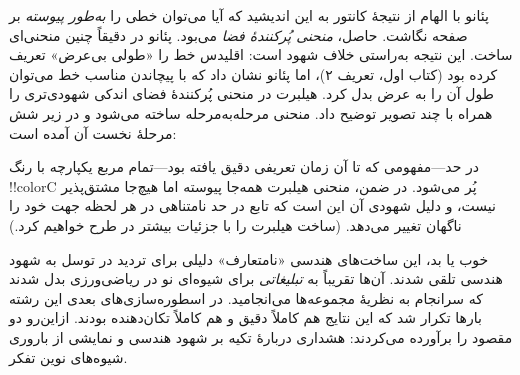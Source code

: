 \documentclass[../../../include/open-logic-section]{subfiles}
\begin{document}
پئانو با الهام از نتیجهٔ کانتور به این اندیشید که آیا می‌توان خطی را
\emph{به‌طور پیوسته} بر صفحه نگاشت. حاصل، \emph{منحنی پُرکنندهٔ فضا}
می‌بود. پئانو در \citeyear{Peano1890} دقیقاً چنین منحنی‌ای ساخت. این نتیجه
به‌راستی خلاف شهود است: اقلیدس خط را «طولی بی‌عرض» تعریف کرده بود (کتاب
اول، تعریف ۲)، اما پئانو نشان داد که با پیچاندن مناسب خط می‌توان طول آن را
به عرض بدل کرد. هیلبرت در \citeyear{Hilbert1891} منحنی پُرکنندهٔ فضای
اندکی شهودی‌تری را همراه با چند تصویر توضیح داد. منحنی مرحله‌به‌مرحله
ساخته می‌شود و در زیر شش مرحلهٔ نخست آن آمده است:
\begin{center}
\end{center}
در حد---مفهومی که تا آن زمان تعریفی دقیق یافته بود---تمام مربع یکپارچه
با رنگ !!{colorC} پُر می‌شود. در ضمن، منحنی هیلبرت همه‌جا پیوسته اما
هیچ‌جا مشتق‌پذیر نیست، و دلیل شهودی آن این است که تابع در حد نامتناهی در
هر لحظه جهت خود را ناگهان تغییر می‌دهد. (ساخت هیلبرت را با جزئیات بیشتر
در  طرح خواهیم کرد.)

خوب یا بد، این ساخت‌های هندسی «نامتعارف» دلیلی برای تردید در توسل به شهود
هندسی تلقی شدند. آن‌ها تقریباً به \emph{تبلیغاتی} برای شیوه‌ای نو در
ریاضی‌ورزی بدل شدند که سرانجام به نظریهٔ مجموعه‌ها می‌انجامید. در
اسطوره‌سازی‌های بعدی این رشته بارها تکرار شد که این نتایج هم کاملاً دقیق
و هم کاملاً تکان‌دهنده بودند. ازاین‌رو دو مقصود را برآورده می‌کردند:
هشداری دربارهٔ تکیه بر شهود هندسی و نمایشی از باروری شیوه‌های نوین تفکر.
\end{document}
